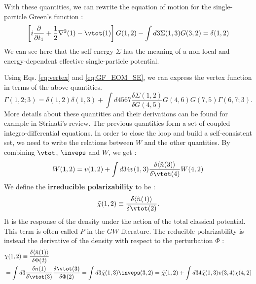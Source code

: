 With these quantities, we can rewrite the equation of motion for the single-particle Green's function :
\begin{equation}
	\left[ i \frac{\partial}{\partial t_1} + \frac{1}{2}\nabla^2(1) - \vtot (1)\right] G(1,2) - \int d3 \Sigma(1,3) G(3,2) = \delta(1,2) \label{eq:GF_EOM_SE}
\end{equation}
We can see here that the self-energy $\Sigma$ has the meaning of a non-local and energy-dependent effective single-particle potential.
%

Using Eqs. \eqref{eq:vertex} and \eqref{eq:GF_EOM_SE}, we can express the vertex function in terms of the above quantities. 
\begin{equation}
	\Gamma(1,2;3) = \delta(1,2) \delta(1,3) + \int d4567 \frac{\delta \Sigma(1,2)}{\delta G(4,5)} G(4,6) G(7,5) \Gamma(6,7;3). \label{eq:vertex_hedin}
\end{equation}
More details about these quantities and their derivations can be found for example in Strinati's review. \cite{strinati1988application}
The previous quantities form a set of coupled integro-differential equations. In order to close the loop and build a self-consistent set, we need to write the relations between $W$ and the other quantities. By combining $\vtot$, $\inveps$ and $W$, we get :
\begin{equation}
	W(1,2) = v(1,2) + \int d34 v(1,3) \frac{\delta \langle \hat{n}(3)\rangle}{\delta \vtot (4)} W(4,2)
\end{equation}
We define the \textbf{irreducible polarizability} to be :
\begin{equation}
	\tilde{\chi}(1,2) \equiv \frac{\delta \langle \hat{n}(1)\rangle}{\delta \vtot (2)}. \label{eq:P_dn/dV}
\end{equation}
It is the response of the density under the action of the total classical potential. This term is often called $P$ in the $GW$ literature. The reducible polarizability is instead the derivative of the density with respect to the perturbation $\Phi$ :
\begin{align}
	&\chi(1,2) \equiv \frac{\delta \langle \hat{n}(1)\rangle}{\delta \Phi (2)}\\
	 &= \int d3 \frac{\delta n(1)}{\delta \vtot(3)} \frac{\delta \vtot(3)}{\delta \Phi (2)} = \int d3 \tilde{\chi}(1,3)\inveps(3,2) = \tilde{\chi}(1,2) + \int d34 \tilde{\chi}(1,3) v(3,4) \chi(4,2) \label{eq:chi_dn/dPhi}
\end{align}

